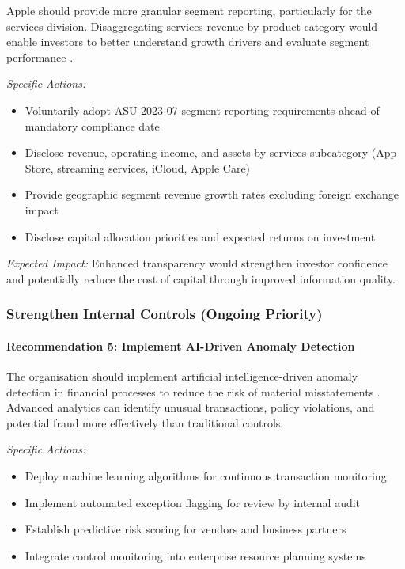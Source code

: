 \documentclass[12pt,a4paper]{article}
\begin{document}
Apple should provide more granular segment reporting, particularly for the services division. Disaggregating services revenue by product category would enable investors to better understand growth drivers and evaluate segment performance \citep{fasb2023}.

\textit{Specific Actions:}
\begin{itemize}
\item Voluntarily adopt ASU 2023-07 segment reporting requirements ahead of mandatory compliance date
\item Disclose revenue, operating income, and assets by services subcategory (App Store, streaming services, iCloud, Apple Care)
\item Provide geographic segment revenue growth rates excluding foreign exchange impact
\item Disclose capital allocation priorities and expected returns on investment
\end{itemize}

\textit{Expected Impact:} Enhanced transparency would strengthen investor confidence and potentially reduce the cost of capital through improved information quality.

\subsubsection{Strengthen Internal Controls (Ongoing Priority)}

\paragraph{Recommendation 5: Implement AI-Driven Anomaly Detection}

The organisation should implement artificial intelligence-driven anomaly detection in financial processes to reduce the risk of material misstatements \citep{aicpa2020}. Advanced analytics can identify unusual transactions, policy violations, and potential fraud more effectively than traditional controls.

\textit{Specific Actions:}
\begin{itemize}
\item Deploy machine learning algorithms for continuous transaction monitoring
\item Implement automated exception flagging for review by internal audit
\item Establish predictive risk scoring for vendors and business partners
\item Integrate control monitoring into enterprise resource planning systems
\end{itemize}
\end{document}
